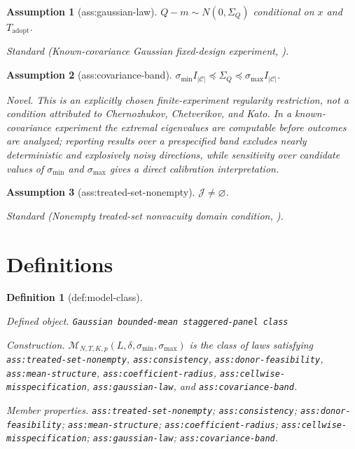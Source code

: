\documentclass{article}
\newtheorem{assumption}{Assumption}
\newtheorem{definition}{Definition}
\begin{document}
\begin{assumption}[ass:gaussian-law]\label{ass:gaussian-law}
\(Q-m\sim N(0,\Sigma_Q)\) conditional on \(x\) and \(T_{\mathrm{adopt}}\).
\par\smallskip\noindent\emph{Standard} (Known-covariance Gaussian fixed-design experiment, \cite{ArmstrongKolesar2018}).
\end{assumption}

\begin{assumption}[ass:covariance-band]\label{ass:covariance-band}
\(\sigma_{\min}I_{|\mathcal C|}\preceq\Sigma_Q\preceq\sigma_{\max}I_{|\mathcal C|}\).
\par\smallskip\noindent\emph{Novel.} This is an explicitly chosen finite-experiment regularity restriction, not a condition attributed to Chernozhukov, Chetverikov, and Kato. In a known-covariance experiment the extremal eigenvalues are computable before outcomes are analyzed; reporting results over a prespecified band excludes nearly deterministic and explosively noisy directions, while sensitivity over candidate values of \(\sigma_{\min}\) and \(\sigma_{\max}\) gives a direct calibration interpretation.
\end{assumption}

\begin{assumption}[ass:treated-set-nonempty]\label{ass:treated-set-nonempty}
\(\mathcal J\ne\varnothing\).
\par\smallskip\noindent\emph{Standard} (Nonempty treated-set nonvacuity domain condition, \cite{BenMichaelFellerRothstein2022}).
\end{assumption}

\section{Definitions}

\begin{definition}[def:model-class]\label{def:model-class}
\par\smallskip\noindent\emph{Defined object.} \texttt{Gaussian bounded-\allowbreak{}mean staggered-\allowbreak{}panel class}
\par\smallskip\noindent\emph{Construction.} \(\mathcal M_{N,T,K,p}(L,\delta,\sigma_{\min},\sigma_{\max})\) is the class
of laws satisfying \texttt{ass:treated-set-nonempty},
\texttt{ass:consistency}, \texttt{ass:donor-feasibility},
\texttt{ass:mean-structure}, \texttt{ass:coefficient-radius},
\texttt{ass:cellwise-misspecification}, \texttt{ass:gaussian-law}, and
\texttt{ass:covariance-band}.
\par\smallskip\noindent\emph{Member properties.} \texttt{ass:\allowbreak{}treated-\allowbreak{}set-\allowbreak{}nonempty}; \texttt{ass:\allowbreak{}consistency}; \texttt{ass:\allowbreak{}donor-\allowbreak{}feasibility}; \texttt{ass:\allowbreak{}mean-\allowbreak{}structure}; \texttt{ass:\allowbreak{}coefficient-\allowbreak{}radius}; \texttt{ass:\allowbreak{}cellwise-\allowbreak{}misspecification}; \texttt{ass:\allowbreak{}gaussian-\allowbreak{}law}; \texttt{ass:\allowbreak{}covariance-\allowbreak{}band}.
\end{definition}
\end{document}
